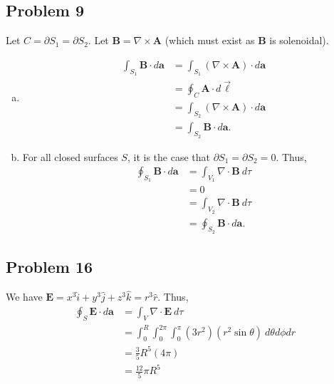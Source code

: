 \documentclass[10pt]{mypackage}
\begin{document}
\subsection{Problem 9}%
Let $C = \partial S_1 = \partial S_2$. Let $\mathbf{B} = \nabla \times \mathbf{A}$ (which must exist as $\mathbf{B}$ is solenoidal).
\begin{enumerate}[(a)]
  \item 
    \begin{align*}
      \int_{S_1}\mathbf{B}\cdot d\mathbf{a} &= \int_{S_1}\left(\nabla \times \mathbf{A}\right)\cdot d\mathbf{a}\\
                                            &= \oint_{C}\mathbf{A}\cdot d\vec{\ell}\\
                                            &= \int_{S_2}\left(\nabla \times \mathbf{A}\right)\cdot d\mathbf{a}\\
                                            &= \int_{S_2}\mathbf{B}\cdot d\mathbf{a}.
    \end{align*}
  \item For all closed surfaces $S$, it is the case that $\partial S_1 = \partial S_2 = 0$. Thus,
    \begin{align*}
      \oint_{S_1}\mathbf{B}\cdot d\mathbf{a} &= \int_{V_1}\nabla \cdot \mathbf{B}\:d\tau\\
                                             &= 0\\
                                             &= \int_{V_2}\nabla \cdot \mathbf{B}\:d\tau\\
                                             &= \oint_{S_2}\mathbf{B}\cdot d\mathbf{a}.
    \end{align*}
\end{enumerate}
\subsection{Problem 16}%
We have $\mathbf{E} = x^3\hat{i} + y^3\hat{j} + z^3\hat{k} = r^3\hat{r}$. Thus,
\begin{align*}
  \oint_{S}\mathbf{E}\cdot d\mathbf{a} &= \int_{V}\nabla \cdot \mathbf{E}\:d\tau\\
                                       &= \int_{0}^{R}\int_{0}^{2\pi}\int_{0}^{\pi}\left(3r^2\right)\left(r^2\sin\theta\right)\:d\theta d\phi dr\\
                                       &= \frac{3}{5}R^5\left(4\pi\right)\\
                                       &= \frac{12}{5}\pi R^5
\end{align*}
\end{document}
